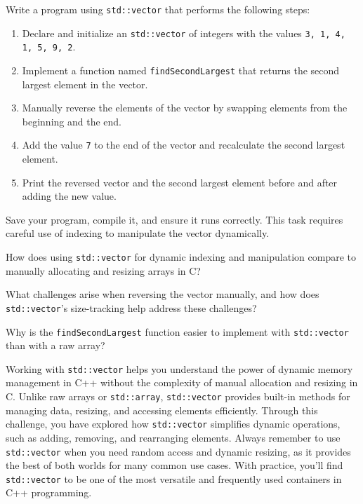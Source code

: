 \begin{challenge}
    \begin{task}
        Write a program using \texttt{std::vector} that performs the following steps:
        \begin{enumerate}
            \item Declare and initialize an \texttt{std::vector} of integers with the values \texttt{3, 1, 4, 1, 5, 9, 2}.
            \item Implement a function named \texttt{findSecondLargest} that returns the second largest element in the vector.
            \item Manually reverse the elements of the vector by swapping elements from the beginning and the end.
            \item Add the value \texttt{7} to the end of the vector and recalculate the second largest element.
            \item Print the reversed vector and the second largest element before and after adding the new value.
        \end{enumerate}

        Save your program, compile it, and ensure it runs correctly. This task requires careful use of indexing to manipulate the vector dynamically.

        \begin{questions}
            \item How does using \texttt{std::vector} for dynamic indexing and manipulation compare to manually allocating and resizing arrays in C?
            \item What challenges arise when reversing the vector manually, and how does \texttt{std::vector}'s size-tracking help address these challenges?
            \item Why is the \texttt{findSecondLargest} function easier to implement with \texttt{std::vector} than with a raw array?
        \end{questions}
    \end{task}

    \begin{advise}
        Working with \texttt{std::vector} helps you understand the power of dynamic memory management in C++ without the complexity of manual allocation and resizing in C. 
        Unlike raw arrays or \texttt{std::array}, \texttt{std::vector} provides built-in methods for managing data, resizing, and accessing elements efficiently. 
        Through this challenge, you have explored how \texttt{std::vector} simplifies dynamic operations, such as adding, removing, and rearranging elements. 
        Always remember to use \texttt{std::vector} when you need random access and dynamic resizing, as it provides the best of both worlds for many common use cases. 
        With practice, you'll find \texttt{std::vector} to be one of the most versatile and frequently used containers in C++ programming.
    \end{advise}
\end{challenge}
